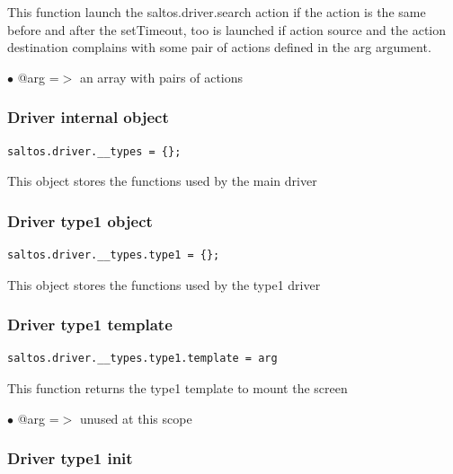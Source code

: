 \documentclass[a4paper]{article}
\begin{document}
This function launch the saltos.driver.search action if the action is the
same before and after the setTimeout, too is launched if action source and
the action destination complains with some pair of actions defined in the
arg argument.

\begin{compactitem}
\item[\color{myblue}$\bullet$] @arg =$>$ an array with pairs of actions
\end{compactitem}

\hypertarget{toc180}{}
\subsubsection{Driver internal object}

\begin{lstlisting}
saltos.driver.__types = {};
\end{lstlisting}

This object stores the functions used by the main driver

\hypertarget{toc181}{}
\subsubsection{Driver type1 object}

\begin{lstlisting}
saltos.driver.__types.type1 = {};
\end{lstlisting}

This object stores the functions used by the type1 driver

\hypertarget{toc182}{}
\subsubsection{Driver type1 template}

\begin{lstlisting}
saltos.driver.__types.type1.template = arg
\end{lstlisting}

This function returns the type1 template to mount the screen

\begin{compactitem}
\item[\color{myblue}$\bullet$] @arg =$>$ unused at this scope
\end{compactitem}

\hypertarget{toc183}{}
\subsubsection{Driver type1 init}
\end{document}

